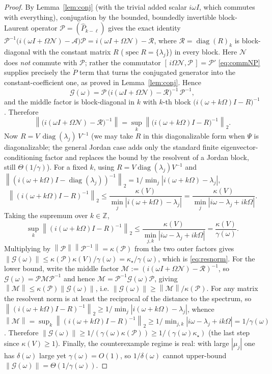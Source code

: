 \documentclass{amsart}
\theoremstyle{definition}
\DeclareMathOperator{\spec}{spec}
\DeclareMathOperator{\diag}{diag}
\newcommand{\Z}{\mathbb{Z}}
\newcommand{\norm}[1]{\left\lVert#1\right\rVert}
\newcommand{\Acal}{\mathcal{A}}
\newcommand{\Ncal}{\mathcal{N}}
\begin{document}
\begin{proof}
By Lemma~\ref{lem:conj} (with the trivial added scalar $i\omega I$, which
commutes with everything), conjugation by the bounded, boundedly invertible
block-Laurent operator $\mathcal P=(\hat P_{k-\ell})$ gives the exact identity
$\mathcal P^{-1}\big(i(\omega I+\Omega\Ncal)-\Acal\big)\mathcal P
=i(\omega I+\Omega\Ncal)-\mathcal R$, where $\mathcal R=\diag(R)_k$ is
block-diagonal with the constant matrix $R$ ($\spec R=\{\lambda_j\}$) in every
block. Here $\Ncal$ does \emph{not} commute with $\mathcal P$; rather the
commutator $[\,i\Omega\Ncal,\mathcal P\,]=\mathcal P'$ \eqref{eq:commNP} supplies
precisely the $\dot P$ term that turns the conjugated generator into the
constant-coefficient one, as proved in Lemma~\ref{lem:conj}. Hence
\[
\mathcal G(\omega)=\mathcal P\,\big(i(\omega I+\Omega\Ncal)-\mathcal R\big)^{-1}\,\mathcal P^{-1},
\]
and the middle factor is block-diagonal in $k$ with $k$-th block
$\big(i(\omega+k\Omega)I-R\big)^{-1}$. Therefore
\[
\norm{\big(i(\omega I+\Omega\Ncal)-\mathcal R\big)^{-1}}
=\sup_k\norm{\big(i(\omega+k\Omega)I-R\big)^{-1}}_2 .
\]
Now $R=V\,\diag(\lambda_j)\,V^{-1}$ (we may take $R$ in this diagonalizable form
when $\Psi$ is diagonalizable; the general Jordan case adds only the standard
finite eigenvector-conditioning factor and replaces the bound by the resolvent
of a Jordan block, still $\Theta(1/\gamma)$). For a fixed $k$, using $R=V\diag(\lambda_j)V^{-1}$ and
$\norm{(i(\omega+k\Omega)I-\diag(\lambda_j))^{-1}}_2
=1/\min_j|i(\omega+k\Omega)-\lambda_j|$,
\[
\norm{(i(\omega+k\Omega)I-R)^{-1}}_2
\le \frac{\kappa(V)}{\min_j|i(\omega+k\Omega)-\lambda_j|}
= \frac{\kappa(V)}{\min_j|i\omega-\lambda_j+ik\Omega|}.
\]
Taking the supremum over $k\in\Z$,
\[
\sup_k\norm{(i(\omega+k\Omega)I-R)^{-1}}_2
\le \frac{\kappa(V)}{\min_{j,k}|i\omega-\lambda_j+ik\Omega|}
= \frac{\kappa(V)}{\gamma(\omega)}.
\]
Multiplying by $\norm{\mathcal P}\norm{\mathcal P^{-1}}=\kappa(\mathcal P)$ from
the two outer factors gives
$\norm{\mathcal G(\omega)}\le\kappa(\mathcal P)\kappa(V)/\gamma(\omega)
=\kappa_\star/\gamma(\omega)$, which is \eqref{eq:resnorm}. For the lower bound, write the middle factor
$\mathcal M:=(i(\omega I+\Omega\Ncal)-\mathcal R)^{-1}$, so
$\mathcal G(\omega)=\mathcal P\mathcal M\mathcal P^{-1}$ and hence
$\mathcal M=\mathcal P^{-1}\mathcal G(\omega)\mathcal P$, giving
$\norm{\mathcal M}\le\kappa(\mathcal P)\norm{\mathcal G(\omega)}$, i.e.
$\norm{\mathcal G(\omega)}\ge\norm{\mathcal M}/\kappa(\mathcal P)$. For any
matrix the resolvent norm is at least the reciprocal of the distance to the
spectrum, so
$\norm{(i(\omega+k\Omega)I-R)^{-1}}_2\ge 1/\min_j|i(\omega+k\Omega)-\lambda_j|$,
whence $\norm{\mathcal M}=\sup_k\norm{(i(\omega+k\Omega)I-R)^{-1}}_2\ge
1/\min_{j,k}|i\omega-\lambda_j+ik\Omega|=1/\gamma(\omega)$. Therefore
$\norm{\mathcal G(\omega)}\ge 1/(\gamma(\omega)\kappa(\mathcal P))\ge
1/(\gamma(\omega)\kappa_\star)$ (the last step since $\kappa(V)\ge1$). Finally, the
counterexample regime is real: with large $|\mu_j|$ one has $\delta(\omega)$
large yet $\gamma(\omega)=O(1)$, so $1/\delta(\omega)$ cannot upper-bound
$\norm{\mathcal G(\omega)}=\Theta(1/\gamma(\omega))$.
\end{proof}
\end{document}
